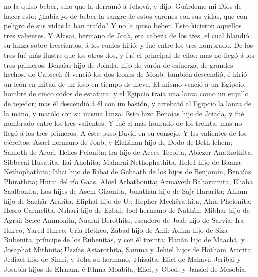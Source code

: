 no la quiso beber, sino que la derramó á Jehová, y dijo: 
Guárdeme mi Dios de hacer esto: ¿había yo de beber la sangre de estos
varones con sus vidas, que con peligro de sus vidas la han traído? Y no
la quiso beber. Esto hicieron aquellos tres valientes.  Y
Abisai, hermano de Joab, era cabeza de los tres, el cual blandió su
lanza sobre trescientos, á los cuales hirió; y fué entre los tres
nombrado.  De los tres fué más ilustre que los otros dos, y
fué el principal de ellos: mas no llegó á los tres primeros.
 Benaías hijo de Joiada, hijo de varón de esfuerzo, de
grandes hechos, de Cabseel: él venció los dos leones de Moab: también
descendió, é hirió un león en mitad de un foso en tiempo de nieve.
 El mismo venció á un Egipcio, hombre de cinco codos de
estatura: y el Egipcio traía una lanza como un enjullo de tejedor; mas
él descendió á él con un bastón, y arrebató al Egipcio la lanza de la
mano, y matólo con su misma lanza.  Esto hizo Benaías hijo
de Joiada, y fué nombrado entre los tres valientes.  Y fué
el más honrado de los treinta, mas no llegó á los tres primeros. A éste
puso David en su consejo.  Y los valientes de los
ejércitos: Asael hermano de Joab, y Elchânan hijo de Dodo de Beth-lehem;
 Samoth de Arori, Helles Pelonita;  Ira hijo
de Acces Tecoita, Abiezer Anathothita;  Sibbecai Husatita,
Ilai Ahohita;  Maharai Nethophathita, Heled hijo de Baana
Nethophathita;  Ithai hijo de Ribai de Gabaath de los hijos
de Benjamín, Benaías Phirathita;  Hurai del río Gaas, Abiel
Arbathonita;  Azmaveth Baharumita, Eliaba Saalbonita;
 Los hijos de Asem Gizonita, Jonathán hijo de Sajé
Hararita;  Ahiam hijo de Sachâr Ararita, Eliphal hijo de
Ur;  Hepher Mechêrathita, Ahía Phelonita; 
Hesro Carmelita, Nahari hijo de Ezbai;  Joel hermano de
Nathán, Mibhar hijo de Agrai;  Selec Ammonita, Naarai
Berothita, escudero de Joab hijo de Sarvia;  Ira Ithreo,
Yared Ithreo;  Uría Hetheo, Zabad hijo de Ahli;
 Adina hijo de Siza Rubenita, príncipe de los Rubenitas, y
con él treinta;  Hanán hijo de Maachâ, y Josaphat Mithnita;
 Uzzías Astarothita, Samma y Jehiel hijos de Hotham
Arorita;  Jediael hijo de Simri, y Joha su hermano,
Thisaita;  Eliel de Mahaví, Jeribai y Josabia hijos de
Elnaam, é Ithma Moabita;  Eliel, y Obed, y Jaasiel de
Mesobia.

